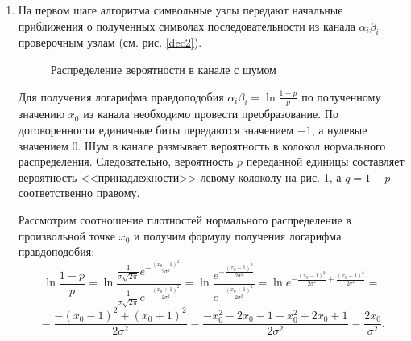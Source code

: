 \begin{enumerate}[label=\arabic*.]
\item
На первом шаге алгоритма символьные узлы передают начальные приближения о
полученных символах последовательности из канала $\alpha_i \beta_i$ проверочным узлам (см. рис. \ref{dec2}).


\begin{figure}
\centering
{}
\caption{Распределение вероятности в канале с шумом}
\label{belimg}
\end{figure}

Для получения логарифма правдоподобия $\alpha_i\beta_i=\ln \frac{1-p}{p}$ 
по полученному значению $x_0$ из канала необходимо
провести преобразование. По договоренности единичные биты передаются значением $-1$, а нулевые значением
$0$. Шум в канале размывает вероятность в колокол нормального распределения. Следовательно,
вероятность $p$ переданной единицы составляет вероятность <<принадлежности>> левому колоколу на рис. \ref{belimg},
а $q=1-p$ соответственно правому.

Рассмотрим соотношение плотностей нормального распределение в произвольной точке $x_0$ и получим
формулу получения логарифма правдоподобия:
\[
\ln\frac{1-p}{p}=\ln \frac{\frac{1}{\sigma \sqrt{2 \pi}} e^{-\frac{(x_0-1)^2}{2\sigma^2}}}
         {\frac{1}{\sigma \sqrt{2 \pi}} e^{-\frac{(x_0+1)^2}{2\sigma^2}}} =
         \ln \frac{e^{-\frac{(x_0-1)^2}{2\sigma^2}}}
         		  {e^{-\frac{(x_0+1)^2}{2\sigma^2}}}=
         		 \ln e^{-\frac{(x_0-1)^2}{2\sigma^2}+\frac{(x_0+1)^2}{2\sigma^2}}=
\]
\[
	= \frac{-(x_0-1)^2+(x_0+1)^2}{2\sigma^2}=\frac{-x_0^2+2x_0-1+x_0^2+2x_0+1}{2\sigma^2}=
	 \frac{2x_0}{\sigma^2}.
\]


\end{enumerate}
